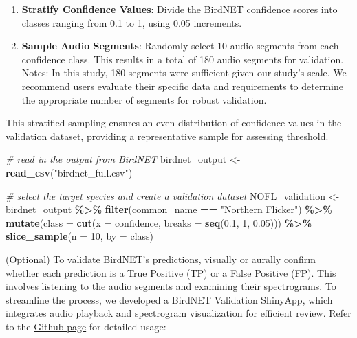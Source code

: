 \documentclass[
]{article}
\newenvironment{Shaded}{\begin{snugshade}}{\end{snugshade}}
\newcommand{\AttributeTok}[1]{\textcolor[rgb]{0.13,0.29,0.53}{#1}}
\newcommand{\CommentTok}[1]{\textcolor[rgb]{0.56,0.35,0.01}{\textit{#1}}}
\newcommand{\DecValTok}[1]{\textcolor[rgb]{0.00,0.00,0.81}{#1}}
\newcommand{\FloatTok}[1]{\textcolor[rgb]{0.00,0.00,0.81}{#1}}
\newcommand{\FunctionTok}[1]{\textcolor[rgb]{0.13,0.29,0.53}{\textbf{#1}}}
\newcommand{\NormalTok}[1]{#1}
\newcommand{\OtherTok}[1]{\textcolor[rgb]{0.56,0.35,0.01}{#1}}
\newcommand{\SpecialCharTok}[1]{\textcolor[rgb]{0.81,0.36,0.00}{\textbf{#1}}}
\newcommand{\StringTok}[1]{\textcolor[rgb]{0.31,0.60,0.02}{#1}}
\begin{document}
\begin{enumerate}
\def\labelenumi{\arabic{enumi}.}
\item
  \textbf{Stratify Confidence Values}: Divide the BirdNET confidence
  scores into classes ranging from 0.1 to 1, using 0.05 increments.
\item
  \textbf{Sample Audio Segments}: Randomly select 10 audio segments from
  each confidence class. This results in a total of 180 audio segments
  for validation. Notes: In this study, 180 segments were sufficient
  given our study's scale. We recommend users evaluate their specific
  data and requirements to determine the appropriate number of segments
  for robust validation.
\end{enumerate}

This stratified sampling ensures an even distribution of confidence
values in the validation dataset, providing a representative sample for
assessing threshold.

\begin{Shaded}
\begin{Highlighting}[]
\CommentTok{\# read in the output from BirdNET}
\NormalTok{birdnet\_output }\OtherTok{\textless{}{-}} \FunctionTok{read\_csv}\NormalTok{(}\StringTok{"birdnet\_full.csv"}\NormalTok{)}

\CommentTok{\# select the target species and create a validation dataset}
\NormalTok{NOFL\_validation }\OtherTok{\textless{}{-}}\NormalTok{ birdnet\_output }\SpecialCharTok{\%\textgreater{}\%}
  \FunctionTok{filter}\NormalTok{(common\_name }\SpecialCharTok{==} \StringTok{"Northern Flicker"}\NormalTok{) }\SpecialCharTok{\%\textgreater{}\%}
  \FunctionTok{mutate}\NormalTok{(}\AttributeTok{class =} \FunctionTok{cut}\NormalTok{(}\AttributeTok{x =}\NormalTok{ confidence, }\AttributeTok{breaks =} \FunctionTok{seq}\NormalTok{(}\FloatTok{0.1}\NormalTok{, }\DecValTok{1}\NormalTok{, }\FloatTok{0.05}\NormalTok{))) }\SpecialCharTok{\%\textgreater{}\%}
  \FunctionTok{slice\_sample}\NormalTok{(}\AttributeTok{n =} \DecValTok{10}\NormalTok{, }\AttributeTok{by =}\NormalTok{ class)}
\end{Highlighting}
\end{Shaded}

(Optional) To validate BirdNET's predictions, visually or aurally
confirm whether each prediction is a True Positive (TP) or a False
Positive (FP). This involves listening to the audio segments and
examining their spectrograms. To streamline the process, we developed a
BirdNET Validation ShinyApp, which integrates audio playback and
spectrogram visualization for efficient review. Refer to the
\href{https://github.com/SunnyTseng/BirdNET_validation}{Github page} for
detailed usage:
\end{document}
